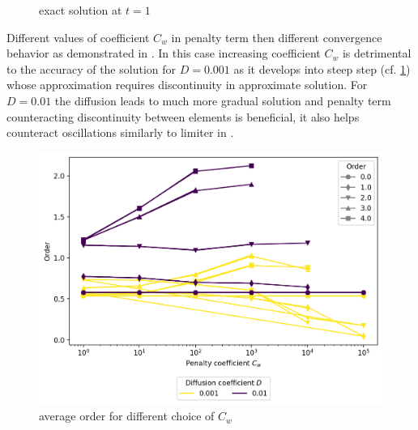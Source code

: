 \begin{example}
\begin{figure}[h]
	\caption{ exact solution at $t = 1$}
	\label{fig:burgess_hesthaven_ext}
\end{figure}
Different values of coefficient $C_w$ in penalty term then different convergence 
behavior as demonstrated in . In this case increasing 
coefficient $C_w$ is detrimental to the accuracy of the solution for $D=0.001$ as it 
develops into steep step (cf. \cref{fig:burgess_hesthaven_ext}) whose approximation 
requires discontinuity in approximate solution. For $D=0.01$ the diffusion leads to much 
more gradual solution and penalty term counteracting discontinuity between elements is 
beneficial, it also helps counteract oscillations similarly to limiter in 
. 
\end{example}


\begin{figure}[h!]
	\centering
	\includegraphics[scale=.6]{../figs/parametric/burgers_1D/orders_unlimited}
	\caption{ average order for different choice of $C_w$}
	\label{fig:burgess_ordersunlimited}
\end{figure}


